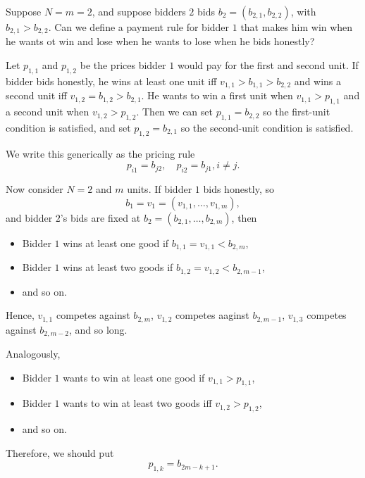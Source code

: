 Suppose $N=m=2$, and suppose bidders $2$ bids $b_2 = \left( b_{2,1}, b_{2,2} \right)$, with $b_{2,1} > b_{2,2}$. Can we define a payment rule for bidder $1$ that makes him win when he wants ot win and lose when he wants to lose when he bids honestly?

Let $p_{1,1}$ and $p_{1,2}$ be the prices bidder $1$ would pay for the first and second unit. If bidder bids honestly, he wins at least one unit iff $v_{1,1} > b_{1,1} > b_{2,2}$ and wins a second unit iff $v_{1,2} = b_{1,2} > b_{2,1}$. He wants to win a first unit when $v_{1,1} > p_{1,1}$ and a second unit when $v_{1,2} > p_{1,2}$.
Then we can set $p_{1,1} = b_{2,2}$ so the first-unit condition is satisfied, and set $p_{1,2} = b_{2,1}$ so the second-unit condition is satisfied.

We write this generically as the pricing rule \[
	p_{i 1} = b_{j 2}, \quad p_{i 2} = b_{j 1}, i \ne j
.\] 

Now consider $N=2$ and $m$ units.
If bidder $1$ bids honestly, so
\[
	b_1 = v_1 = \left( v_{1,1},\ldots,v_{1,m} \right),
\]
and bidder $2$'s bids are fixed at $b_2 = \left( b_{2,1},\ldots,b_{2,m} \right)$, then
\begin{itemize}
	\item Bidder $1$ wins at least one good if $b_{1,1} = v_{1,1} < b_{2,m}$,
	\item Bidder $1$ wins at least two goods if $b_{1,2} = v_{1,2} < b_{2,m-1}$,
	\item and so on.
\end{itemize}
Hence, $v_{1,1}$ competes against $b_{2,m}$, $v_{1,2}$ competes aaginst $b_{2,m-1}$, $v_{1,3}$ competes against $b_{2,m-2}$, and so long.

Analogously,
\begin{itemize}
	\item Bidder $1$ wants to win at least one good if $v_{1,1} > p_{1,1}$,
	\item Bidder $1$ wants to win at least two goods iff $v_{1,2} > p_{1,2}$,
	\item and so on.
\end{itemize}

Therefore, we should put \[
	p_{1,k} = b_{2m - k +1}
.\] 

